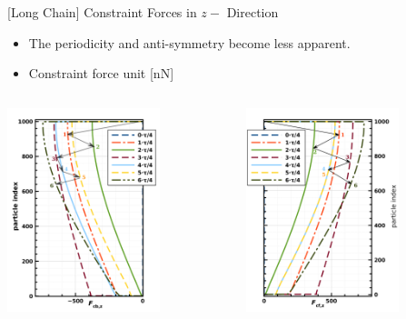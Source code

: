 \documentclass[t,presentation]{beamer}
\begin{document}
\begin{frame}[label={sec:org843a995}]{[Long Chain] Constraint  Forces  in \(z-\) Direction}
\begin{itemize}
\item The periodicity and anti-symmetry become less apparent.
\item Constraint force unit [nN]
\end{itemize}
\begin{columns}[c]
\begin{column}{.45\textwidth}
\centering
\includegraphics[width=1.75in]{figures/cZpvdf1000FC1.png}\par
\end{column}
\begin{column}{.45\textwidth} %
\centering
\includegraphics[width=1.75in]{figures/cZpvdf1000FC2.png}\par
\end{column}
\end{columns}
\end{frame}
\end{document}
